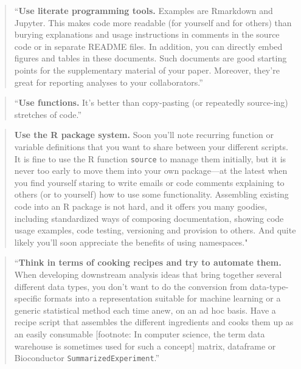 \documentclass[]{tufte-book}
\begin{document}
\begin{quote}
``\textbf{Use literate programming tools.} Examples are Rmarkdown and Jupyter. This
makes code more readable (for yourself and for others) than burying
explanations and usage instructions in comments in the source code or in
separate README files. In addition, you can directly embed figures and tables
in these documents. Such documents are good starting points for the supplementary
material of your paper. Moreover, they're great for reporting analyses to your
collaborators.'' \citep{holmes2018modern}
\end{quote}

\begin{quote}
``\textbf{Use functions.} It's better than copy-pasting (or repeatedly source-ing)
stretches of code.'' \citep{holmes2018modern}
\end{quote}

\begin{quote}
\textbf{Use the R package system.} Soon you'll note recurring function or variable
definitions that you want to share between your different scripts. It is fine to
use the R function \texttt{source} to manage them initially, but it is never too early
to move them into your own package---at the latest when you find yourself staring
to write emails or code comments explaining to others (or to yourself) how to use
some functionality. Assembling existing code into an R package is not hard, and it
offers you many goodies, including standardized ways of composing documentation,
showing code usage examples, code testing, versioning and provision to others.
And quite likely you'll soon appreciate the benefits of using namespaces."
\citep{holmes2018modern}
\end{quote}

\begin{quote}
``\textbf{Think in terms of cooking recipes and try to automate them.} When developing
downstream analysis ideas that bring together several different data types, you
don't want to do the conversion from data-type-specific formats into a
representation suitable for machine learning or a generic statistical method
each time anew, on an ad hoc basis. Have a recipe script that assembles the
different ingredients and cooks them up as an easily consumable {[}footnote:
In computer science, the term data warehouse is sometimes used for such a concept{]}
matrix, dataframe or Bioconductor \texttt{SummarizedExperiment}.'' \citep{holmes2018modern}
\end{quote}
\end{document}
